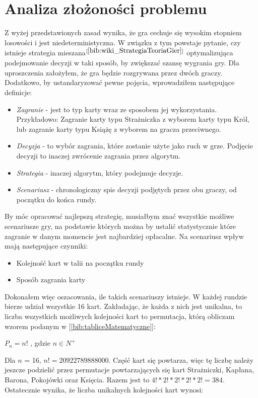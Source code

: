 \section{Analiza złożoności problemu}
\label{sec:opisProblemu}
Z wyżej przedstawionych zasad wynika, że gra cechuje się wysokim stopniem losowości i jest niedeterministyczna. W związku z tym powstaje pytanie, czy istnieje strategia mieszana$^{[\ref{bib:wiki_StrategiaTeoriaGier}]}$ optymalizująca podejmowanie decyzji w taki sposób, by zwiększać szansę wygrania gry. Dla uproszczenia założyłem, że gra będzie rozgrywana przez dwóch graczy. Dodatkowo, by ustandaryzować pewne pojęcia, wprowadziłem następujące definicje:
\begin{itemize}
	\item \textit{Zagranie} - jest to typ karty wraz ze sposobem jej wykorzystania. Przykładowo: Zagranie karty typu Strażniczka z wyborem karty typu Król, lub zagranie karty typu Książę z wyborem na gracza przeciwnego.
	\item \textit{Decyzja} - to wybór zagrania, które zostanie użyte jako ruch w grze. Podjęcie decyzji to inaczej zwrócenie zagrania przez algorytm.
	\item \textit{Strategia} - inaczej algorytm, który podejmuje decyzje. 
	\item \textit{Scenariusz} - chronologiczny spis decyzji podjętych przez obu graczy, od początku do końca rundy.
\end{itemize}

By móc opracować najlepszą strategię, musiałbym znać wszystkie możliwe scenariusze gry, na podstawie których można by ustalić statystycznie które zagranie w danym momencie jest najbardziej opłacalne. Na scenariusz wpływ mają następujące czynniki:
\begin{itemize}
	\item Kolejność kart w talii na początku rundy
	\item Sposób zagrania karty
\end{itemize}
Dokonałem więc oszacowania, ile takich scenariuszy istnieje. W każdej rundzie bierze udział wszystkie 16 kart. Zakładając, że każda z nich jest unikalna, to  liczba wszystkich możliwych kolejności kart to permutacja, którą obliczam wzorem podanym w [\ref{bib:tabliceMatematyczne}]:

\begin{center}
	$P_n = n!$ , gdzie $n\in N^+$
\end{center}

Dla  $n$ = 16, $n!=20 922 789 888 000$. Część kart się powtarza, więc tę liczbę należy jeszcze podzielić przez permutacje powtarzających się kart Strażniczki, Kapłana, Barona, Pokojówki oraz Księcia. Razem jest to $4! * 2! * 2! * 2! * 2! =  384$. Ostatecznie wynika, że liczba unikalnych kolejności kart wynosi: 

